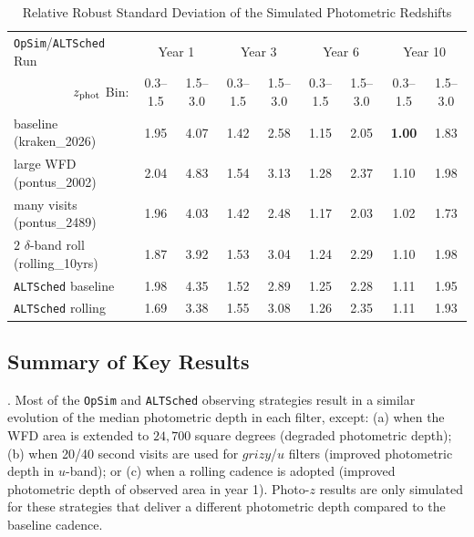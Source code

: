 \begin{table}
\caption{Relative Robust Standard Deviation of the Simulated Photometric Redshifts}
\label{tab:zbins}
\begin{center}
\begin{tabular}{|l|cc|cc|cc|cc|}
\hline
{\tt OpSim}/{\tt ALTSched} Run & \multicolumn{2}{|c|}{Year 1} & \multicolumn{2}{|c|}{Year 3} & \multicolumn{2}{|c|}{Year 6} & \multicolumn{2}{|c|}{Year 10} \\ 
\multicolumn{1}{|r|}{$z_{\rm phot}$ Bin:} & 0.3--1.5 & 1.5--3.0 & 0.3--1.5 & 1.5--3.0 & 0.3--1.5 & 1.5--3.0 & 0.3--1.5 & 1.5--3.0 \\
\hline
baseline (kraken\_2026)                 & 1.95 & 4.07 & 1.42 & 2.58 & 1.15 & 2.05 & {\bf 1.00} & 1.83 \\ 
large WFD (pontus\_2002)                & 2.04 & 4.83 & 1.54 & 3.13 & 1.28 & 2.37 & 1.10 & 1.98 \\
many visits (pontus\_2489)              & 1.96 & 4.03 & 1.42 & 2.48 & 1.17 & 2.03 & 1.02 & 1.73 \\
$2$ $\delta$-band roll (rolling\_10yrs) & 1.87 & 3.92 & 1.53 & 3.04 & 1.24 & 2.29 & 1.10 & 1.98 \\
{\tt ALTSched} baseline                       & 1.98 & 4.35 & 1.52 & 2.89 & 1.25 & 2.28 & 1.11 & 1.95 \\
{\tt ALTSched} rolling                        & 1.69 & 3.38 & 1.55 & 3.08 & 1.26 & 2.35 & 1.11 & 1.93 \\
\hline
\end{tabular}
\end{center}
\end{table}


\subsection{Summary of Key Results} \label{ssec:pz_execsum}

. Most of the {\tt OpSim} and {\tt ALTSched} observing strategies result in a similar evolution of the median photometric depth in each filter, except: (a) when the WFD area is extended to $24,700$ square degrees (degraded photometric depth); (b) when 20/40 second visits are used for $grizy$/$u$ filters (improved photometric depth in $u$-band); or (c) when a rolling cadence is adopted (improved photometric depth of observed area in year 1). Photo-$z$ results are only simulated for these strategies that deliver a different photometric depth compared to the baseline cadence.

